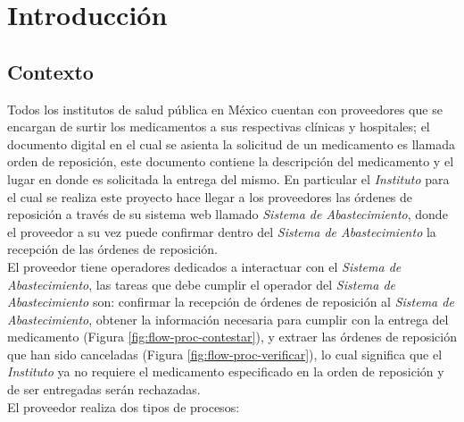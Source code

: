 \chapter{Introducción}\label{cap1}

\section{Contexto} \label{sec:intro-contexto}
Todos los institutos de salud pública en México cuentan con proveedores que se encargan de surtir los medicamentos a sus respectivas clínicas y hospitales; el documento digital en el cual se asienta la solicitud de un medicamento es llamada orden de reposición, este documento contiene la descripción del medicamento y el lugar en donde es solicitada la entrega del mismo. En particular el \textit{Instituto} para el cual se realiza este proyecto hace llegar a los proveedores las órdenes de reposición a través de su sistema web llamado \textit{Sistema de Abastecimiento}, donde el proveedor a su vez puede confirmar dentro del \textit{Sistema de Abastecimiento} la recepción de las órdenes de reposición.\\
El proveedor tiene operadores dedicados a interactuar con el \textit{Sistema de Abastecimiento}, las tareas que debe cumplir el operador del \textit{Sistema de Abastecimiento} son: confirmar la recepción de órdenes de reposición al \textit{Sistema de Abastecimiento}, obtener la información necesaria para cumplir con la entrega del medicamento (Figura \ref{fig:flow-proc-contestar}), y extraer las órdenes de reposición que han sido canceladas (Figura \ref{fig:flow-proc-verificar}), lo cual significa que el \textit{Instituto} ya no requiere el medicamento especificado en la orden de reposición y de ser entregadas serán rechazadas.\\
El proveedor realiza dos tipos de procesos:
